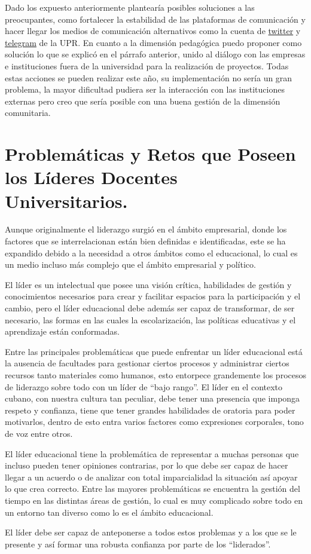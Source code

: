 \documentclass{article}
\begin{document}
{Dado los expuesto anteriormente plantearía posibles soluciones a las preocupantes, como fortalecer la estabilidad de las plataformas de comunicación y hacer llegar los medios de comunicación alternativos como la cuenta de \href{https://twitter.com/UPR_Cuba}{twitter} y \href{https://t.me/CanalUprCuba}{telegram} de la UPR. En cuanto a la dimensión pedagógica puedo proponer como solución lo que se explicó en el párrafo anterior, unido al diálogo con las empresas e instituciones fuera de la universidad para la realización de proyectos. Todas estas acciones se pueden realizar este año, su implementación no sería un gran problema, la mayor dificultad pudiera ser la interacción con las instituciones externas pero creo que sería posible con una buena gestión de la dimensión comunitaria.}

\section*{\color{uprgreen} Problemáticas y Retos que Poseen los Líderes Docentes Universitarios.}
\label{sec:PRPLDU}
{\justifying\fontsize{13}{18}\large

Aunque originalmente el liderazgo surgió en el ámbito empresarial, donde los factores que se interrelacionan están bien definidas e identificadas, este se ha expandido debido a la necesidad a otros ámbitos como el educacional, lo cual es un medio incluso más complejo que el ámbito empresarial y político. \hyperref[educ]{\text{$[3]$}}

El líder es un intelectual que posee una visión crítica, habilidades de gestión y conocimientos necesarios para crear y facilitar espacios para la participación y el cambio, pero el líder educacional debe además ser capaz de transformar, de ser necesario, las formas en las cuales la escolarización, las políticas educativas y el aprendizaje están conformadas. \hyperref[PGL]{\text{$[1]$}}\hyperref[BLE]{\text{$[2]$}}

Entre las principales problemáticas que puede enfrentar un líder educacional está la ausencia de facultades para gestionar ciertos procesos y administrar ciertos recursos tanto materiales como humanos, esto entorpece grandemente los procesos de liderazgo sobre todo con un líder de ``bajo rango''. El líder en el contexto cubano, con nuestra cultura tan peculiar, debe tener una presencia que imponga respeto y confianza, tiene que tener grandes habilidades de oratoria para poder motivarlos, dentro de esto entra varios factores como expresiones corporales, tono de voz entre otros.

El líder educacional tiene la problemática de representar a muchas personas que incluso pueden tener opiniones contrarias, por lo que debe ser capaz de hacer llegar a un acuerdo o de analizar con total imparcialidad la situación así apoyar lo que crea correcto. Entre las mayores problemáticas se encuentra la gestión del tiempo en las distintas áreas de gestión, lo cual es muy complicado sobre todo en un entorno tan diverso como lo es el ámbito educacional.

El líder debe ser capaz de anteponerse a todos estos problemas y a los que se le presente y así formar una robusta confianza por parte de los ``liderados''.
}
\end{document}
